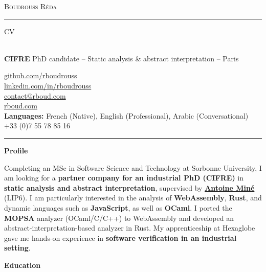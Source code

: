 \documentclass[10pt,A4]{article}
\newcommand{\cvsection}[1]
{
	\begin{center}
		\large\textcolor{sectcol}{\textbf{#1}}
	\end{center}
}
\newcommand{\metasection}[2]
{
\footnotesize{#2} \hspace*{\fill} \footnotesize{#1}\\[1pt]
}
\begin{document}
\pagestyle{fancy}


\vspace{-8pt}
\begin{center}
    {\HUGE \textsc{Boudrouss Réda} \textcolor{sectcol}{\rule[-1mm]{1mm}{0.9cm}} \textsc{CV}}\\[2pt]
    {\small \textbf{CIFRE} PhD candidate -- Static analysis \& abstract interpretation -- Paris}
\end{center}

\vspace{6pt}

\metasection{\href{https://github.com/rboudrouss}{github.com/rboudrouss}}{}
\metasection{\href{https://www.linkedin.com/in/rboudrouss}{linkedin.com/in/rboudrouss}}{}
\metasection{\href{mailto:contact@rboud.com}{contact@rboud.com}}{}
\metasection{\href{https://rboud.com}{rboud.com}}{}
\metasection{+33 (0)7 55 78 85 16}{\textbf{Languages:} French (Native), English (Professional), Arabic (Conversational)}

\vspace{-15pt}
\textcolor{softcol}{\hrule}

\normalsize

\cvsection{Profile}
Completing an MSc in Software Science and Technology at Sorbonne University, I am looking for a \textbf{partner company for an industrial PhD (CIFRE)} in \textbf{static analysis and abstract interpretation}, supervised by \href{https://mine.perso.lip6.fr/index.html.fr}{\textbf{Antoine Miné}} (LIP6). I am particularly interested in the analysis of \textbf{WebAssembly}, \textbf{Rust}, and dynamic languages such as \textbf{JavaScript}, as well as \textbf{OCaml}. I ported the \textbf{MOPSA} analyzer (OCaml/C/C++) to WebAssembly and developed an abstract-interpretation-based analyzer in Rust. My apprenticeship at Hexaglobe gave me hands-on experience in \textbf{software verification in an industrial setting}.

\cvsection{Education}
\end{document}
